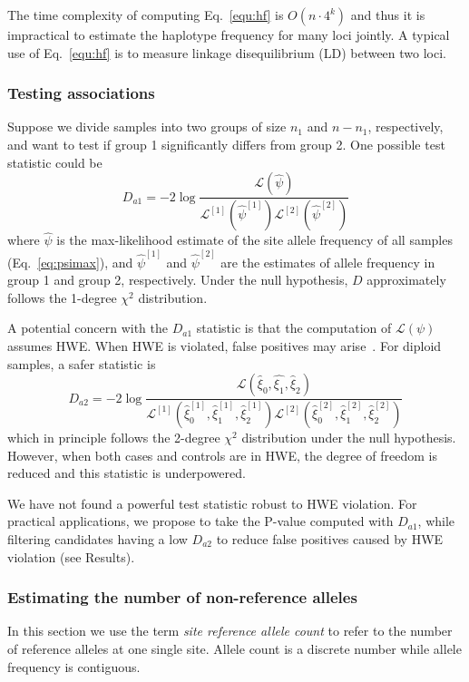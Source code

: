 \documentclass{bioinfo}
\begin{document}
\begin{methods}
The time complexity of computing Eq.~\eqref{equ:hf} is $O(n\cdot 4^k)$ and thus
it is impractical to estimate the haplotype frequency for many loci jointly.  A
typical use of Eq.~\eqref{equ:hf} is to measure linkage disequilibrium (LD)
between two loci.

\subsubsection{Testing associations}
Suppose we divide samples into two groups of size $n_1$ and $n-n_1$,
respectively, and want to test if group 1 significantly differs from group 2.
One possible test statistic could be~\citep{Kim:2010ve,Kim:2011fk}
\begin{equation}\label{eq:asso1}
D_{a1}=-2\log\frac{\mathcal{L}(\hat{\psi})}{\mathcal{L}^{[1]}(\hat{\psi}^{[1]})\mathcal{L}^{[2]}(\hat{\psi}^{[2]})}
\end{equation}
where $\hat{\psi}$ is the max-likelihood estimate of the site allele frequency
of all samples (Eq.~\ref{eq:psimax}), and $\hat{\psi}^{[1]}$ and
$\hat{\psi}^{[2]}$ are the estimates of allele frequency in group 1 and group
2, respectively.  Under the null hypothesis, $D$ approximately follows the
1-degree $\chi^2$ distribution.

A potential concern with the $D_{a1}$ statistic is that the computation of $\mathcal{L}(\psi)$
assumes HWE.  When HWE is violated, false positives may
arise~\citep{Nielsen:2011fk}. For diploid samples, a safer statistic is
\begin{equation}\label{eq:asso2}
D_{a2}=-2\log\frac{\mathcal{L}(\hat{\xi}_0,\hat{\xi_1},\hat{\xi}_2)}
{\mathcal{L}^{[1]}(\hat{\xi}_0^{[1]},\hat{\xi}_1^{[1]},\hat{\xi}_2^{[1]})\mathcal{L}^{[2]}(\hat{\xi}_0^{[2]},\hat{\xi}_1^{[2]},\hat{\xi}_2^{[2]})}
\end{equation}
which in principle follows the 2-degree $\chi^2$ distribution under the null
hypothesis.  However, when both cases and controls are in HWE, the degree of
freedom is reduced and this statistic is underpowered.

We have not found a powerful test statistic robust to HWE violation. For
practical applications, we propose to take the P-value computed with $D_{a1}$,
while filtering candidates having a low $D_{a2}$ to reduce false positives
caused by HWE violation (see Results).

\subsubsection{Estimating the number of non-reference alleles}
In this section we use the term \emph{site reference allele count} to refer to
the number of reference alleles at one single site. Allele count is a discrete number
while allele frequency is contiguous.


\end{methods}
\end{document}
